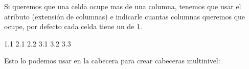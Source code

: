 \documentclass[letterpaper,10pt,spanish]{sphinxmanual}
\begin{document}
Si queremos que una celda ocupe mas de una columna, tenemos que usar el
atributo  (extensión de columnas) e indicarle cuantas columnas
queremos que ocupe, por defecto cada celda tiene un  de 1.

%
\begin{sphinxVerbatim}[commandchars=\\\{\}]
 
       1.1
      2.1
       2.2
      3.1
      3.2
      3.3
\end{sphinxVerbatim}



Esto lo podemos usar en la cabecera para crear cabeceras multinivel:
\end{document}
